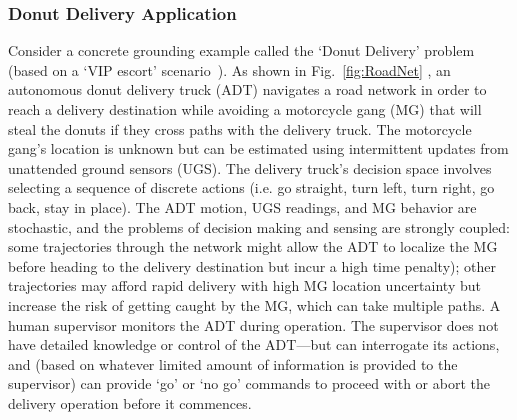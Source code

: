 \subsubsection{Donut Delivery Application} \label{sec:donut_delivery}
Consider a concrete grounding example called the `Donut Delivery' problem (based on a `VIP escort' scenario~\cite{Humphrey2012-lr}). As shown in Fig.~\ref{fig:RoadNet} , an autonomous donut delivery truck (ADT) navigates a road network in order to reach a delivery destination while avoiding a motorcycle gang (MG) that will steal the donuts if they cross paths with the delivery truck. The motorcycle gang's location is unknown but can be estimated using intermittent updates from unattended ground sensors (UGS). The delivery truck's decision space involves selecting a sequence of discrete actions (i.e. go straight, turn left, turn right, go back, stay in place). The ADT motion, UGS readings, and MG behavior are stochastic, and the problems of decision making and sensing are strongly coupled: some trajectories through the network might allow the ADT to localize the MG before heading to the delivery destination but incur a high time penalty); other trajectories may afford rapid delivery with high MG location uncertainty but increase the risk of getting caught by the MG, which can take multiple paths. A human supervisor monitors the ADT during operation. The supervisor does not have detailed knowledge or control of the ADT---but can interrogate its actions, and (based on whatever limited amount of information is provided to the supervisor) can provide `go' or `no go' commands to proceed with or abort the delivery operation before it commences. 

